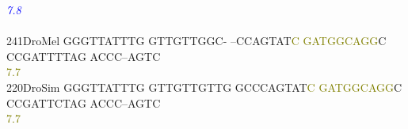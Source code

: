 \documentclass[11pt,twoside,reqno,a4paper]{article}
\begin{document}
{\hspace*{4\charwidth}\hspace*{7\charwidth}\hspace*{1\charwidth}\hspace*{1\charwidth}\hspace*{1\charwidth}\hspace*{1\charwidth}\hspace*{43\charwidth}\textit{\textcolor{blue}{7.8}}\hspace*{1\charwidth}\hspace*{1\charwidth}\\
\\
241\hspace*{1\charwidth}DroMel	GGGTTATTTG	GTTGTTGGC-	--CCAGTAT\textcolor{olive}{C}	\textcolor{olive}{G}\textcolor{olive}{A}\textcolor{olive}{T}\textcolor{olive}{G}\textcolor{olive}{G}\textcolor{olive}{C}\textcolor{olive}{A}\textcolor{olive}{G}\textcolor{olive}{G}C	CCGATTTTAG	ACCC--AGTC	\\
\hspace*{4\charwidth}\hspace*{7\charwidth}\hspace*{1\charwidth}\hspace*{1\charwidth}\hspace*{29\charwidth}\textcolor{olive}{7.7}\hspace*{1\charwidth}\hspace*{1\charwidth}\hspace*{1\charwidth}\hspace*{1\charwidth}\\
220\hspace*{1\charwidth}DroSim	GGGTTATTTG	GTTGTTGTTG	GCCCAGTAT\textcolor{olive}{C}	\textcolor{olive}{G}\textcolor{olive}{A}\textcolor{olive}{T}\textcolor{olive}{G}\textcolor{olive}{G}\textcolor{olive}{C}\textcolor{olive}{A}\textcolor{olive}{G}\textcolor{olive}{G}C	CCGATTCTAG	ACCC--AGTC	\\
\hspace*{4\charwidth}\hspace*{7\charwidth}\hspace*{1\charwidth}\hspace*{1\charwidth}\hspace*{29\charwidth}\textcolor{olive}{7.7}\hspace*{1\charwidth}\hspace*{1\charwidth}\hspace*{1\charwidth}\hspace*{1\charwidth}\\
}
\end{document}
